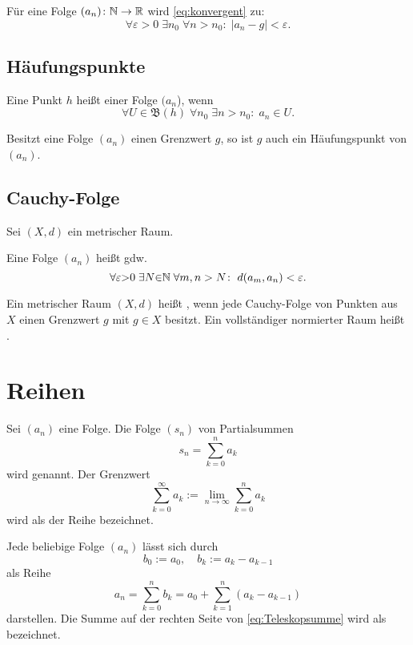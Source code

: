 Für eine Folge $(a_n)\colon\mathbb N\to\mathbb R$ wird \eqref{eq:konvergent} zu:
\begin{equation}
\forall\varepsilon{>}0\;\exists n_0\;\forall n{>}n_0\colon\;
|a_n-g|<\varepsilon.
\end{equation}

\subsection{Häufungspunkte}
\begin{Definition}
Eine Punkt $h$ heißt  einer Folge $(a_n$), wenn
\begin{equation}
\forall U{\in}\mathfrak B(h)\;\forall n_0\;\exists n{>}n_0\colon\;
a_n\in U.
\end{equation}
\end{Definition}
\noindent
Besitzt eine Folge $(a_n)$ einen Grenzwert $g$, so ist $g$ auch ein
Häufungspunkt von $(a_n)$.

\subsection{Cauchy-Folge}
Sei $(X,d)$ ein metrischer Raum.
\begin{Definition}
Eine Folge $(a_n)$ heißt 
gdw.
\begin{equation}
\forall\varepsilon{>}0\;\exists N{\in}\mathbb N\;\forall m,n>N\colon\;
d(a_m,a_n)<\varepsilon.
\end{equation}
\end{Definition}
\noindent
Ein metrischer Raum $(X,d)$ heißt ,
wenn jede Cauchy-Folge von Punkten aus $X$ einen Grenzwert $g$
mit $g\in X$ besitzt. Ein vollständiger normierter Raum heißt
.

\section{Reihen}
\begin{Definition}
Sei $(a_n)$ eine Folge. Die Folge $(s_n)$ von
Partialsummen
\begin{equation}
s_n = \sum_{k=0}^n a_k
\end{equation}
wird  genannt. Der Grenzwert
\begin{equation}
\sum_{k=0}^\infty a_k := \lim_{n\to\infty}\sum_{k=0}^n a_k
\end{equation}
wird als  der Reihe bezeichnet.
\end{Definition}
Jede beliebige Folge $(a_n)$ lässt sich durch
\begin{equation}
b_0:=a_0,\quad b_k:=a_k-a_{k-1}
\end{equation}
als Reihe
\begin{equation}\label{eq:Teleskopsumme}
a_n = \sum_{k=0}^n b_k = a_0+\sum_{k=1}^n (a_k-a_{k-1})
\end{equation}
darstellen. Die Summe auf der rechten Seite von \eqref{eq:Teleskopsumme}
wird als  bezeichnet.


